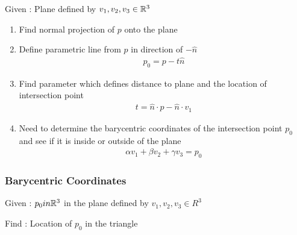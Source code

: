 Given : Plane defined by \( v_1, v_2, v_3 \in \mathbb{R}^3\)
\begin{enumerate}
    \item Find normal projection of \( p \) onto the plane
    \item Define parametric line from \( p \) in direction of \( - \hat n \)
        \begin{align}
            p_0 = p - t \hat n
        \end{align}
    \item Find parameter which defines distance to plane and the location of intersection point
        \begin{align}
            t = \hat n \cdot p - \hat n \cdot v_1
        \end{align}
    \item Need to determine the barycentric coordinates of the intersection point \( p_0\) and see if it is inside or outside of the plane
        \begin{align}
            \alpha v_1 + \beta v_2 + \gamma v_3 = p_0
        \end{align}
\end{enumerate}

\subsubsection{Barycentric Coordinates}

Given : \( p_0 in \mathbb{R}^3\) in the plane defined by \( v_1, v_2, v_3 \in R^3\)

Find : Location of \( p_0 \) in the triangle

